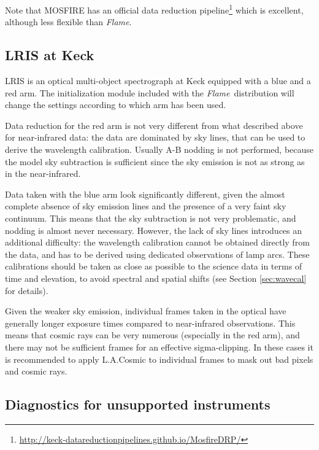 \documentclass[a4paper]{article}
\newcommand{\flame}{\emph{Flame}}
\begin{document}
\begin{sloppypar}
Note that MOSFIRE has an official data reduction pipeline\footnote{\url{http://keck-datareductionpipelines.github.io/MosfireDRP/}} which is excellent, although less flexible than \flame.


\subsection{LRIS at Keck}

LRIS is an optical multi-object spectrograph at Keck equipped with a blue and a red arm. The initialization module included with the \flame\ distribution will change the settings according to which arm has been used.

Data reduction for the red arm is not very different from what described above for near-infrared data: the data are dominated by sky lines, that can be used to derive the wavelength calibration. Usually A-B nodding is not performed, because the model sky subtraction is sufficient since the sky emission is not as strong as in the near-infrared.

Data taken with the blue arm look significantly different, given the almost complete absence of sky emission lines and the presence of a very faint sky continuum. This means that the sky subtraction is not very problematic, and nodding is almost never necessary. However, the lack of sky lines introduces an additional difficulty: the wavelength calibration cannot be obtained directly from the data, and has to be derived using dedicated observations of lamp arcs. These calibrations should be taken as close as possible to the science data in terms of time and elevation, to avoid spectral and spatial shifts (see Section \ref{sec:wavecal} for details).

Given the weaker sky emission, individual frames taken in the optical have generally longer exposure times compared to near-infrared observations. This means that cosmic rays can be very numerous (especially in the red arm), and there may not be sufficient frames for an effective sigma-clipping. In these cases it is recommended to apply L.A.Cosmic to individual frames to mask out bad pixels and cosmic rays.


\subsection{Diagnostics for unsupported instruments}
\label{sec:minimal}


\end{sloppypar}
\end{document}
